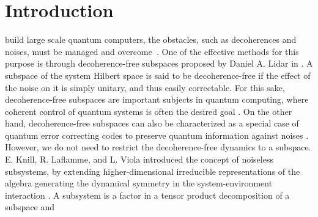 \documentclass[journal]{IEEEtran}
\begin{document}
%
\IEEEpeerreviewmaketitle



\section{Introduction}
% 
% 
% 
% 
build large scale quantum computers, the obstacles, such as decoherences and noises,  must be managed and overcome~\cite{nielsen2010quantum}. One of the effective methods for this purpose is through
decoherence-free subspaces proposed by Daniel A. Lidar in \cite{lidar1998decoherence}. A subspace of the system Hilbert space is said to be decoherence-free if the effect of the noise on it is simply unitary, and thus easily correctable. For this sake, decoherence-free subspaces are important subjects in quantum computing, where coherent control of quantum systems is often the desired goal \cite{lidar2012review}. On the other hand, decoherence-free subspaces  can also be characterized as a special case of quantum error correcting codes to preserve quantum information against noises \cite{lidar2012review}. However, we do not need to restrict the decoherence-free dynamics to a subspace. E. Knill, R. Laflamme, and L. Viola introduced  the concept of noiseless subsystems, by extending higher-dimensional irreducible representations of the algebra generating the dynamical symmetry in the system-environment interaction \cite{knill2000theory}. A subsystem is a factor in a tensor product decomposition of a subspace and 
\end{document}
